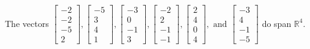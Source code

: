 \begin{exercise}
\begin{exerciseStatement}
  \end{exerciseStatement}
  \begin{exerciseAnswer}
   The vectors \(\left[\begin{array}{r}
-2 \\
-2 \\
-5 \\
2
\end{array}\right] , \left[\begin{array}{r}
-5 \\
3 \\
4 \\
1
\end{array}\right] , \left[\begin{array}{r}
-3 \\
0 \\
-1 \\
3
\end{array}\right] , \left[\begin{array}{r}
-2 \\
2 \\
-1 \\
-1
\end{array}\right] , \left[\begin{array}{r}
2 \\
4 \\
0 \\
4
\end{array}\right] , \text{ and } \left[\begin{array}{r}
-3 \\
4 \\
-1 \\
-5
\end{array}\right]\) 
  	 do  
	span \(\mathbb{R}^4\).
  


  \end{exerciseAnswer}
\end{exercise}